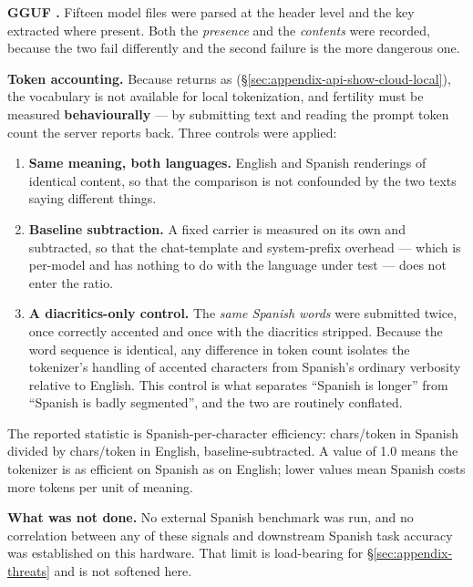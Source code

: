 \textbf{GGUF .} Fifteen model files were parsed at the
header level and the  key extracted where present. Both
the \emph{presence} and the \emph{contents} were recorded, because the two fail
differently and the second failure is the more dangerous one.

\textbf{Token accounting.} Because  returns
 as 
(\S\ref{sec:appendix-api-show-cloud-local}), the vocabulary is not available for
local tokenization, and fertility must be measured \textbf{behaviourally} --- by
submitting text and reading the prompt token count the server reports back.
Three controls were applied:

\begin{enumerate}
  \item \textbf{Same meaning, both languages.} English and Spanish renderings of
        identical content, so that the comparison is not confounded by the two
        texts saying different things.
  \item \textbf{Baseline subtraction.} A fixed carrier is measured on its own and
        subtracted, so that the chat-template and system-prefix overhead --- which
        is per-model and has nothing to do with the language under test --- does
        not enter the ratio.
  \item \textbf{A diacritics-only control.} The \emph{same Spanish words} were
        submitted twice, once correctly accented and once with the diacritics
        stripped. Because the word sequence is identical, any difference in token
        count isolates the tokenizer's handling of accented characters from
        Spanish's ordinary verbosity relative to English. This control is what
        separates ``Spanish is longer'' from ``Spanish is badly segmented'', and
        the two are routinely conflated.
\end{enumerate}

The reported statistic is Spanish-per-character efficiency: chars/token in
Spanish divided by chars/token in English, baseline-subtracted. A value of 1.0
means the tokenizer is as efficient on Spanish as on English; lower values mean
Spanish costs more tokens per unit of meaning.

\textbf{What was not done.} No external Spanish benchmark was run, and no
correlation between any of these signals and downstream Spanish task accuracy
was established on this hardware. That limit is load-bearing for
\S\ref{sec:appendix-threats} and is not softened here.


